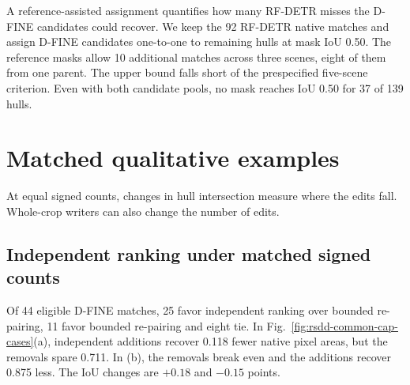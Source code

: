 \documentclass[journal]{IEEEtran}
\begin{document}
A reference-assisted assignment quantifies how many RF-DETR misses the D-FINE candidates could recover. We keep the 92 RF-DETR native matches and assign D-FINE candidates one-to-one to remaining hulls at mask IoU 0.50. The reference masks allow 10 additional matches across three scenes, eight of them from one parent. The upper bound falls short of the prespecified five-scene criterion. Even with both candidate pools, no mask reaches IoU 0.50 for 37 of 139 hulls.

\onecolumn
\begingroup
\renewenvironment{figure*}[1][]{\par\noindent\begin{minipage}{\linewidth}\FigureContext}{\end{minipage}\par}
\section{Matched qualitative examples}
\par\noindent\hfil\begin{minipage}{.85\linewidth}
\label{sec:qualitative}
At equal signed counts, changes in hull intersection measure where the edits fall. Whole-crop writers can also change the number of edits.
\end{minipage}\hfil\par
\par\noindent\hfil\begin{minipage}{.85\linewidth}
\subsection{Independent ranking under matched signed counts}

Of 44 eligible D-FINE matches, 25 favor independent ranking over bounded re-pairing, 11 favor bounded re-pairing and eight tie. In Fig.~\ref{fig:rsdd-common-cap-cases}(a), independent additions recover 0.118 fewer native pixel areas, but the removals spare 0.711. In (b), the removals break even and the additions recover 0.875 less. The IoU changes are \(+0.18\) and \(-0.15\) points.
\end{minipage}\hfil\par
\end{document}
